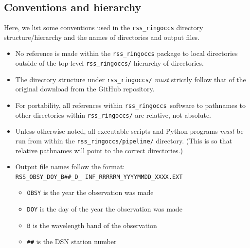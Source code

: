 \documentclass[titlepage, 12pt]{article}
\begin{document}
        \subsection{Conventions and hierarchy}
            Here, we list some conventions used in the
            \texttt{rss\_ringoccs} directory structure/hierarchy
            and the names of directories and output files.
            \begin{itemize}
                \item No reference is made within the
                      \texttt{rss\_ringoccs} package to local
                      directories outside of the top-level
                      \texttt{rss\_ringoccs/}
                      hierarchy of directories.
                \item The directory structure under
                      \texttt{rss\_ringoccs/}
                      \textit{must} strictly follow that of the
                      original download from the GitHub repository.
                \item For portability, all references within
                      \texttt{rss\_ringoccs}\ software to pathnames
                      to other directories within
                      \texttt{rss\_ringoccs/}
                      are relative, not absolute.
                \item Unless otherwise noted,
                      all executable scripts and Python programs
                      \textit{must} be run from within the
                      \texttt{rss\_ringoccs/pipeline/}
                      directory. (This is so that relative
                      pathnames will point to the correct
                      directories.)
                \item Output file names follow the format:\\
                      \texttt{RSS\_OBSY\_DOY\_B\#\#\_D\_%
                              INF\_RRRRRM\_YYYYMMDD\_XXXX.EXT}
                      \begin{itemize}
                          \item \texttt{OBSY} is the year the observation
                                was made
                          \item \texttt{DOY} is the day of the year
                                the observation was made
                          \item \texttt{B} is the wavelength band of the
                                observation
                          \item \texttt{\#\#} is the DSN station number

\end{itemize}
\end{itemize}
\end{document}
